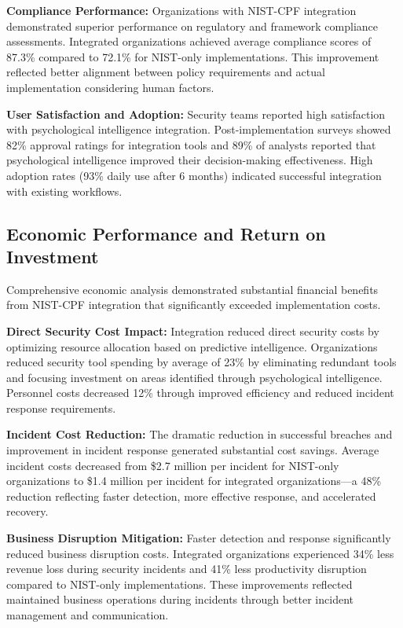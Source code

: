 \documentclass[10pt, twocolumn]{article}
\begin{document}
\textbf{Compliance Performance:} Organizations with NIST-CPF integration demonstrated superior performance on regulatory and framework compliance assessments. Integrated organizations achieved average compliance scores of 87.3\% compared to 72.1\% for NIST-only implementations. This improvement reflected better alignment between policy requirements and actual implementation considering human factors.

\textbf{User Satisfaction and Adoption:} Security teams reported high satisfaction with psychological intelligence integration. Post-implementation surveys showed 82\% approval ratings for integration tools and 89\% of analysts reported that psychological intelligence improved their decision-making effectiveness. High adoption rates (93\% daily use after 6 months) indicated successful integration with existing workflows.

\subsection{Economic Performance and Return on Investment}

Comprehensive economic analysis demonstrated substantial financial benefits from NIST-CPF integration that significantly exceeded implementation costs.

\textbf{Direct Security Cost Impact:} Integration reduced direct security costs by optimizing resource allocation based on predictive intelligence. Organizations reduced security tool spending by average of 23\% by eliminating redundant tools and focusing investment on areas identified through psychological intelligence. Personnel costs decreased 12\% through improved efficiency and reduced incident response requirements.

\textbf{Incident Cost Reduction:} The dramatic reduction in successful breaches and improvement in incident response generated substantial cost savings. Average incident costs decreased from \$2.7 million per incident for NIST-only organizations to \$1.4 million per incident for integrated organizations—a 48\% reduction reflecting faster detection, more effective response, and accelerated recovery.

\textbf{Business Disruption Mitigation:} Faster detection and response significantly reduced business disruption costs. Integrated organizations experienced 34\% less revenue loss during security incidents and 41\% less productivity disruption compared to NIST-only implementations. These improvements reflected maintained business operations during incidents through better incident management and communication.
\end{document}
